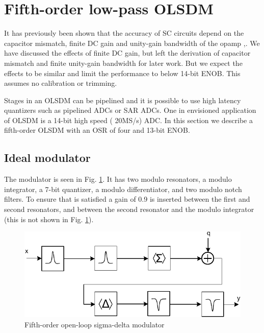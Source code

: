\section{Fifth-order low-pass OLSDM}\label{sdrmatlabsim}
It has previously been shown that the
accuracy of SC circuits depend on the capacitor mismatch, finite DC
gain and unity-gain bandwidth of the opamp
\cite{temes80},\cite{martin81}. We have discussed the effects of
finite DC gain, but left the derivation of capacitor mismatch and
finite unity-gain bandwidth for later
work. But we expect the effects to be similar and limit
the performance to below 14-bit ENOB. This assumes no calibration or
trimming. 

Stages in an OLSDM can be pipelined and it is possible 
to use high latency quantizers such as pipelined ADCs or SAR ADCs. One
in envisioned application of OLSDM is a 14-bit high speed ( 20MS/s) ADC. 
In this section we describe a fifth-order OLSDM with an OSR
of four and 13-bit ENOB.

\subsection{Ideal modulator}
The modulator is  seen in Fig.
\ref{sdrfig:osdr3}. It has two modulo resonators, a
modulo integrator, a 7-bit quantizer, a modulo differentiator, and
two modulo notch filters. To ensure that  is satisfied 
a gain of 0.9 is inserted between the first and second resonators,
and between the second resonator and the modulo integrator (this is not shown in Fig.
\ref{sdrfig:osdr3}). 

\begin{figure}[htbp]
\centerline{ \includegraphics[width=\myfigwidth]{graphics/osdr21_sch}}
  \caption{Fifth-order open-loop sigma-delta modulator}
  \label{sdrfig:osdr3}
\end{figure}

